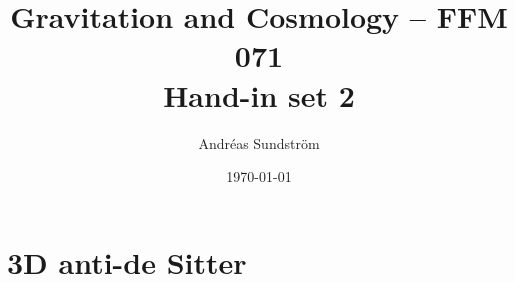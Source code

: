 \documentclass[11pt,a4paper, 
swedish, english %
]{article}
\begin{document}


%


\title{Gravitation and Cosmology -- FFM 071
\\ {\Large Hand-in set 2} }
\author{Andréas Sundström}
\date\today%

\maketitle


\renewcommand{\thesubsection}{\arabic{section} (\roman{subsection})}
\setcounter{section}{8}

\section{3D anti-de Sitter}
\end{document}
